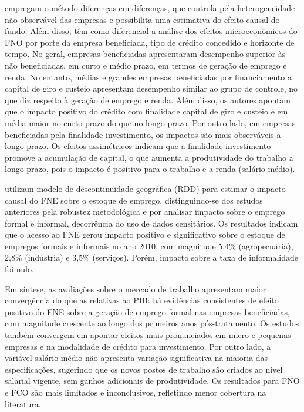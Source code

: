  empregam o método diferenças-em-diferenças, que controla pela heterogeneidade não observável das empresas e possibilita uma estimativa do efeito causal do fundo. Além disso, têm como diferencial a análise dos efeitos microeconômicos do FNO por porte da empresa beneficiada, tipo de crédito concedido e horizonte de tempo. No geral, empresas beneficiadas apresentaram desempenho superior às não beneficiadas, em curto e médio prazo, em termos de geração de emprego e renda. No entanto, médias e grandes empresas beneficiadas por financiamento a capital de giro e custeio apresentam desempenho similar ao grupo de controle, no que diz respeito à geração de emprego e renda. Além disso, os autores apontam que o impacto positivo do crédito com finalidade capital de giro e custeio é em média maior no curto prazo do que no longo prazo. Por outro lado, em empresas beneficiadas pela finalidade investimento, os impactos são mais observáveis a longo prazo. Os efeitos assimétricos indicam que a finalidade investimento promove a acumulação de capital, o que aumenta a produtividade do trabalho a longo prazo, pois o impacto é positivo para o trabalho e a renda (salário médio).

 utilizam modelo de descontinuidade geográfica (RDD) para estimar o impacto causal do FNE sobre o estoque de emprego, distinguindo-se dos estudos anteriores pela robustez metodológica e por analisar impacto sobre o emprego formal e informal, decorrência do uso de dados censitários. Os resultados indicam que o acesso ao FNE gerou impacto positivo e significativo sobre o estoque de empregos formais e informais no ano 2010, com magnitude 5,4\% (agropecuária), 2,8\% (indústria) e 3,5\% (serviços). Porém, impacto sobre a taxa de informalidade foi nulo.

Em síntese, as avaliações sobre o mercado de trabalho apresentam maior convergência do que as relativas ao PIB: há evidências consistentes de efeito positivo do FNE sobre a geração de emprego formal nas empresas beneficiadas, com magnitude crescente ao longo dos primeiros anos pós-tratamento. Os estudos também convergem em apontar efeitos mais pronunciados em micro e pequenas empresas e na modalidade de crédito para investimento. Por outro lado, a variável salário médio não apresenta variação significativa na maioria das especificações, sugerindo que os novos postos de trabalho são criados ao nível salarial vigente, sem ganhos adicionais de produtividade. Os resultados para FNO e FCO são mais limitados e inconclusivos, refletindo menor cobertura na literatura.

